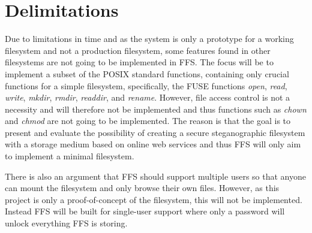 \section{Delimitations} %

Due to limitations in time and as the system is only a prototype for a working filesystem and not a production filesystem, some features found in other filesystems are not going to be implemented in FFS. The focus will be to implement a subset of the POSIX standard functions, containing only crucial functions for a simple filesystem, specifically, the FUSE functions \textit{open}, \textit{read}, \textit{write}, \textit{mkdir}, \textit{rmdir}, \textit{readdir}, and \textit{rename}. However, file access control is not a necessity and will therefore not be implemented and thus functions such as \textit{chown} and \textit{chmod} are not going to be implemented. The reason is that the goal is to present and evaluate the possibility of creating a secure steganographic filesystem with a storage medium based on online web services and thus FFS will only aim to implement a minimal filesystem. 

There is also an argument that FFS should support multiple users so that anyone can mount the filesystem and only browse their own files. However, as this project is only a proof-of-concept of the filesystem, this will not be implemented. Instead FFS will be built for single-user support where only a password will unlock everything FFS is storing.